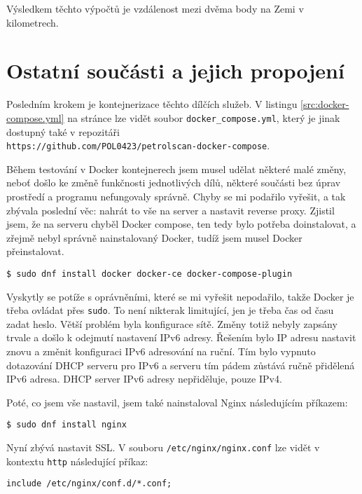 Výsledkem těchto výpočtů je vzdálenost mezi dvěma body na Zemi v kilometrech.

\section{Ostatní součásti a jejich propojení}
\label{sec:other-parts-and-stitching-services-together}

Posledním krokem je kontejnerizace těchto dílčích služeb. V listingu
\ref{src:docker-compose.yml} na stránce \pageref{src:docker-compose.yml}
lze vidět soubor \texttt{docker\_compose.yml}, který je jinak dostupný
také v repozitáři\\
\texttt{https://github.com/POL0423/petrolscan-docker-compose}.

Během testování v Docker kontejnerech jsem musel udělat některé malé
změny, neboť došlo ke změně funkčnosti jednotlivých dílů, některé součásti
bez úprav prostředí a programu nefungovaly správně. Chyby se mi podařilo
vyřešit, a tak zbývala poslední věc: nahrát to vše na server a nastavit
reverse proxy. Zjistil jsem, že na serveru chyběl Docker compose,
ten tedy bylo potřeba doinstalovat, a zřejmě nebyl správně nainstalovaný
Docker, tudíž jsem musel Docker přeinstalovat.

\begin{verbatim}
$ sudo dnf install docker docker-ce docker-compose-plugin
\end{verbatim}

Vyskytly se potíže s oprávněními, které se mi vyřešit nepodařilo,
takže Docker je třeba ovládat přes \texttt{sudo}. To není nikterak
limitující, jen je třeba čas od času zadat heslo. Větší problém byla
konfigurace sítě. Změny totiž nebyly zapsány trvale a došlo k odejmutí
nastavení IPv6 adresy. Řešením bylo IP adresu nastavit znovu a změnit
konfiguraci IPv6 adresování na ruční. Tím bylo vypnuto dotazování DHCP
serveru pro IPv6 a serveru tím pádem zůstává ručně přidělená IPv6 adresa.
DHCP server IPv6 adresy nepřiděluje, pouze IPv4.

Poté, co jsem vše nastavil, jsem také nainstaloval Nginx následujícím
příkazem:

\begin{verbatim}
$ sudo dnf install nginx
\end{verbatim}

Nyní zbývá nastavit SSL. V souboru \texttt{/etc/nginx/nginx.conf}
lze vidět v kontextu \texttt{http} následující příkaz:

\begin{verbatim}
include /etc/nginx/conf.d/*.conf;
\end{verbatim}

